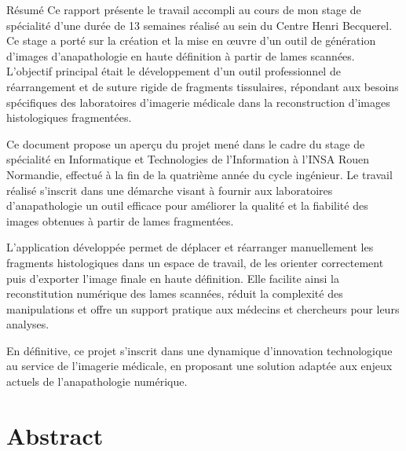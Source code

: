 \documentclass[11pt,a4paper]{report}
\begin{document}
\begin{resume}{Résumé}
Ce rapport présente le travail accompli au cours de mon stage de spécialité d'une durée de 13 semaines réalisé au sein du Centre Henri Becquerel. Ce stage a porté sur la création et la mise en œuvre d'un outil de génération d'images d'anapathologie en haute définition à partir de lames scannées. L'objectif principal était le développement d'un outil professionnel de réarrangement et de suture rigide de fragments tissulaires, répondant aux besoins spécifiques des laboratoires d'imagerie médicale dans la reconstruction d'images histologiques fragmentées.

Ce document propose un aperçu du projet mené dans le cadre du stage de spécialité en Informatique et Technologies de l'Information à l'INSA Rouen Normandie, effectué à la fin de la quatrième année du cycle ingénieur. Le travail réalisé s'inscrit dans une démarche visant à fournir aux laboratoires d'anapathologie un outil efficace pour améliorer la qualité et la fiabilité des images obtenues à partir de lames fragmentées.

L'application développée permet de déplacer et réarranger manuellement les fragments histologiques dans un espace de travail, de les orienter correctement puis d'exporter l'image finale en haute définition. Elle facilite ainsi la reconstitution numérique des lames scannées, réduit la complexité des manipulations et offre un support pratique aux médecins et chercheurs pour leurs analyses.

En définitive, ce projet s'inscrit dans une dynamique d'innovation technologique au service de l'imagerie médicale, en proposant une solution adaptée aux enjeux actuels de l'anapathologie numérique.
\end{resume}

\newpage

\chapter*{Abstract}
\end{document}
